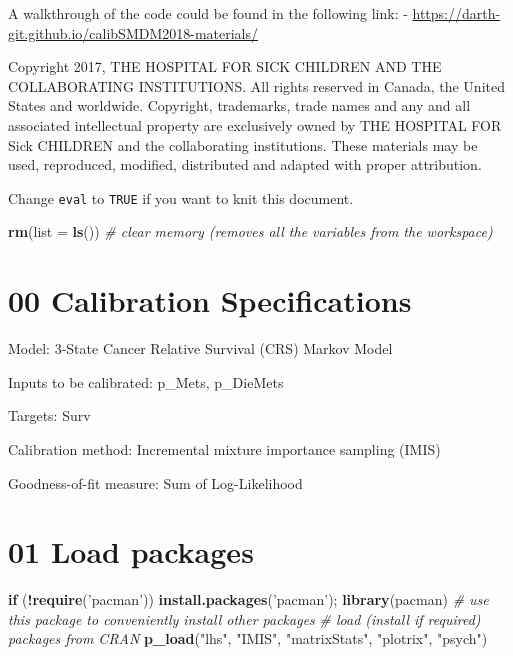 \documentclass[
]{article}
\newenvironment{Shaded}{\begin{snugshade}}{\end{snugshade}}
\newcommand{\CommentTok}[1]{\textcolor[rgb]{0.56,0.35,0.01}{\textit{#1}}}
\newcommand{\ControlFlowTok}[1]{\textcolor[rgb]{0.13,0.29,0.53}{\textbf{#1}}}
\newcommand{\DataTypeTok}[1]{\textcolor[rgb]{0.13,0.29,0.53}{#1}}
\newcommand{\KeywordTok}[1]{\textcolor[rgb]{0.13,0.29,0.53}{\textbf{#1}}}
\newcommand{\NormalTok}[1]{#1}
\newcommand{\OperatorTok}[1]{\textcolor[rgb]{0.81,0.36,0.00}{\textbf{#1}}}
\newcommand{\StringTok}[1]{\textcolor[rgb]{0.31,0.60,0.02}{#1}}
\begin{document}
A walkthrough of the code could be found in the following link: -
\url{https://darth-git.github.io/calibSMDM2018-materials/}

Copyright 2017, THE HOSPITAL FOR SICK CHILDREN AND THE COLLABORATING
INSTITUTIONS. All rights reserved in Canada, the United States and
worldwide. Copyright, trademarks, trade names and any and all associated
intellectual property are exclusively owned by THE HOSPITAL FOR Sick
CHILDREN and the collaborating institutions. These materials may be
used, reproduced, modified, distributed and adapted with proper
attribution.

\newpage

Change \texttt{eval} to \texttt{TRUE} if you want to knit this document.

\begin{Shaded}
\begin{Highlighting}[]
\KeywordTok{rm}\NormalTok{(}\DataTypeTok{list =} \KeywordTok{ls}\NormalTok{())      }\CommentTok{# clear memory (removes all the variables from the workspace)}
\end{Highlighting}
\end{Shaded}

\hypertarget{calibration-specifications}{%
\section{00 Calibration
Specifications}\label{calibration-specifications}}

Model: 3-State Cancer Relative Survival (CRS) Markov Model

Inputs to be calibrated: p\_Mets, p\_DieMets

Targets: Surv

Calibration method: Incremental mixture importance sampling (IMIS)

Goodness-of-fit measure: Sum of Log-Likelihood

\hypertarget{load-packages}{%
\section{01 Load packages}\label{load-packages}}

\begin{Shaded}
\begin{Highlighting}[]
\ControlFlowTok{if}\NormalTok{ (}\OperatorTok{!}\KeywordTok{require}\NormalTok{(}\StringTok{'pacman'}\NormalTok{)) }\KeywordTok{install.packages}\NormalTok{(}\StringTok{'pacman'}\NormalTok{); }\KeywordTok{library}\NormalTok{(pacman) }\CommentTok{# use this package to conveniently install other packages}
\CommentTok{# load (install if required) packages from CRAN}
\KeywordTok{p_load}\NormalTok{(}\StringTok{"lhs"}\NormalTok{, }\StringTok{"IMIS"}\NormalTok{, }\StringTok{"matrixStats"}\NormalTok{, }\StringTok{"plotrix"}\NormalTok{, }\StringTok{"psych"}\NormalTok{)  }
\end{Highlighting}
\end{Shaded}
\end{document}
